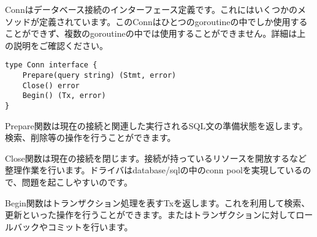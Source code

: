 Connはデータベース接続のインターフェース定義です。これにはいくつかのメソッドが定義されています。このConnはひとつのgoroutineの中でしか使用することができず、複数のgoroutineの中では使用することができません。詳細は上の説明をご確認ください。

\begin{lstlisting}[numbers=none]
type Conn interface {
    Prepare(query string) (Stmt, error)
    Close() error
    Begin() (Tx, error)
}
\end{lstlisting}

Prepare関数は現在の接続と関連した実行されるSQL文の準備状態を返します。検索、削除等の操作を行うことができます。

Close関数は現在の接続を閉じます。接続が持っているリソースを開放するなど整理作業を行います。ドライバはdatabase/sqlの中のconn poolを実現しているので、問題を起こしやすいのです。

Begin関数はトランザクション処理を表すTxを返します。これを利用して検索、更新といった操作を行うことができます。またはトランザクションに対してロールバックやコミットを行います。

